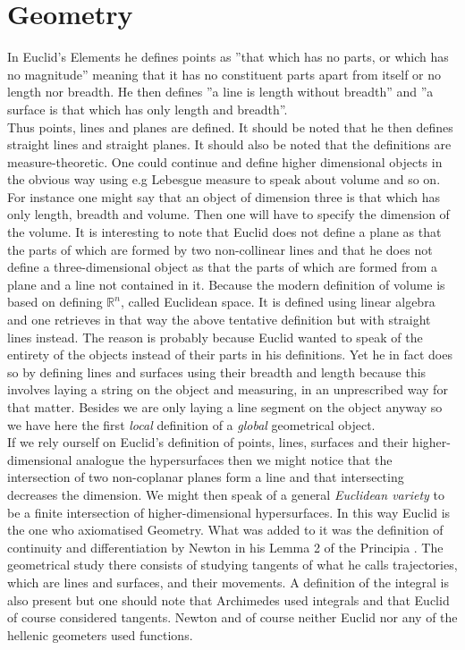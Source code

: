 \documentclass[10pt,a4paper]{amsart}
\begin{document}
\section{Geometry}
In Euclid's Elements \cite{euclid} he defines points as ''that which has no parts, or which has no magnitude'' meaning that it has no constituent parts apart from itself or no length nor breadth. He then defines ''a line is length without breadth'' and ''a surface is that which has only length and breadth''.\\
Thus points, lines and planes are defined. It should be noted that he then defines straight lines and straight planes. It should also be noted that the definitions are measure-theoretic. One could continue and define higher dimensional objects in the obvious way using e.g Lebesgue measure to speak about volume and so on. For instance one might say that an object of dimension three is that which has only length, breadth and volume. Then one will have to specify the dimension of the volume. It is interesting to note that Euclid does not define a plane as that the parts of which are formed by two non-collinear lines and that he does not define a three-dimensional object as that the parts of which are formed from a plane and a line not contained in it. 
Because the modern definition of volume is based on defining $\mathbb{R}^n$, called Euclidean space. It is defined using linear algebra and one retrieves in that way the above tentative definition but with straight lines instead. The reason is probably because Euclid wanted to speak of the entirety of the objects instead of their parts in his definitions. Yet he in fact does so by defining lines and surfaces using their breadth and length because this involves laying a string on the object and measuring, in an unprescribed way for that matter. Besides we are only laying a line segment on the object anyway so we have here the first \emph{local} definition of a \emph{global} geometrical object.\\
If we rely ourself on Euclid's definition of points, lines, surfaces and their higher-dimensional analogue the hypersurfaces then we might notice that the intersection of two non-coplanar planes form a line and that intersecting decreases the dimension. We might then speak of a general \emph{Euclidean variety} to be a finite intersection of higher-dimensional hypersurfaces. In this way Euclid is the one who axiomatised Geometry. What was added to it was the definition of continuity and differentiation by Newton in his Lemma 2 of the Principia \cite{newton}. The geometrical study there consists of studying tangents of what he calls trajectories, which are lines and surfaces, and their movements. A definition of the integral is also present but one should note that Archimedes used integrals and that Euclid of course considered tangents. Newton and of course neither Euclid nor any of the hellenic geometers used functions.\\
\end{document}

